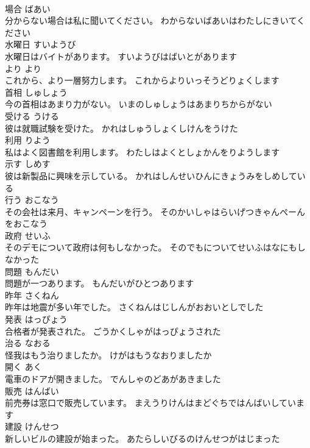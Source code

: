 \documentclass[8pt]{extreport}
\begin{document}
\begin{CJK}{UTF8}{min}
\\	場合	ばあい	
\\	分からない場合は私に聞いてください。	わからないばあいはわたしにきいてください	
\\	水曜日	すいようび	
\\	水曜日はバイトがあります。	すいようびはばいとがあります	
\\	より	より	
\\	これから、より一層努力します。	これからよりいっそうどりょくします	
\\	首相	しゅしょう	
\\	今の首相はあまり力がない。	いまのしゅしょうはあまりちからがない	
\\	受ける	うける	
\\	彼は就職試験を受けた。	かれはしゅうしょくしけんをうけた	
\\	利用	りよう	
\\	私はよく図書館を利用します。	わたしはよくとしょかんをりようします	
\\	示す	しめす	
\\	彼は新製品に興味を示している。	かれはしんせいひんにきょうみをしめしている	
\\	行う	おこなう	
\\	その会社は来月、キャンペーンを行う。	そのかいしゃはらいげつきゃんぺーんをおこなう	
\\	政府	せいふ	
\\	そのデモについて政府は何もしなかった。	そのでもについてせいふはなにもしなかった	
\\	問題	もんだい	
\\	問題が一つあります。	もんだいがひとつあります	
\\	昨年	さくねん	
\\	昨年は地震が多い年でした。	さくねんはじしんがおおいとしでした	
\\	発表	はっぴょう	
\\	合格者が発表された。	ごうかくしゃがはっぴょうされた	
\\	治る	なおる	
\\	怪我はもう治りましたか。	けがはもうなおりましたか	
\\	開く	あく	
\\	電車のドアが開きました。	でんしゃのどあがあきました	
\\	販売	はんばい	
\\	前売券は窓口で販売しています。	まえうりけんはまどぐちではんばいしています	
\\	建設	けんせつ	
\\	新しいビルの建設が始まった。	あたらしいびるのけんせつがはじまった	

\end{CJK}
\end{document}
